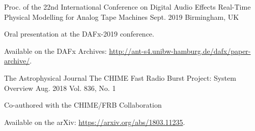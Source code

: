 

\begin{cventries}

  \cventry
    {Proc. of the 22nd International Conference on Digital Audio Effects} %
    {Real-Time Physical Modelling for Analog Tape Machines} %
    {Sept. 2019} %
    {Birmingham, UK} %
    {
      \begin{cvitems} %
        \item {Oral presentation at the DAFx-2019 conference.}
        \item {Available on the DAFx Archives: \url{http://ant-s4.unibw-hamburg.de/dafx/paper-archive/}.}
      \end{cvitems}
    }

    \cventry
    {The Astrophysical Journal} %
    {The CHIME Fast Radio Burst Project: System Overview} %
    {Aug. 2018} %
    {Vol. 836, No. 1} %
    {
      \begin{cvitems} %
        \item {Co-authored with the CHIME/FRB Collaboration}
        \item {Available on the arXiv: \url{https://arxiv.org/abs/1803.11235}.}
      \end{cvitems}
    }


\end{cventries}
